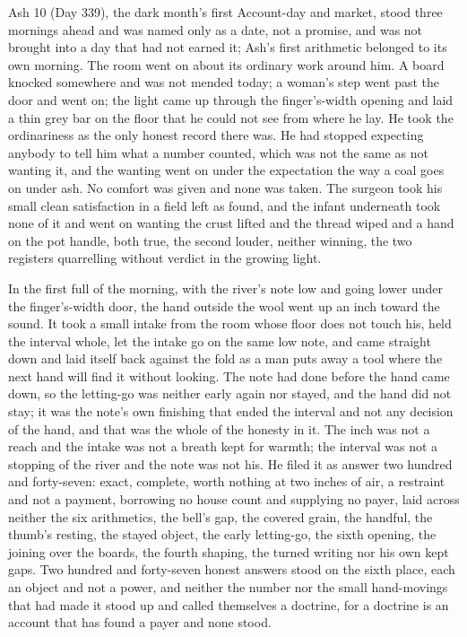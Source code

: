 Ash 10 (Day 339), the dark month's first Account-day and market, stood three mornings ahead and was named only as a date, not a promise, and was not brought into a day that had not earned it; Ash's first arithmetic belonged to its own morning. The room went on about its ordinary work around him. A board knocked somewhere and was not mended today; a woman's step went past the door and went on; the light came up through the finger's-width opening and laid a thin grey bar on the floor that he could not see from where he lay. He took the ordinariness as the only honest record there was. He had stopped expecting anybody to tell him what a number counted, which was not the same as not wanting it, and the wanting went on under the expectation the way a coal goes on under ash. No comfort was given and none was taken. The surgeon took his small clean satisfaction in a field left as found, and the infant underneath took none of it and went on wanting the crust lifted and the thread wiped and a hand on the pot handle, both true, the second louder, neither winning, the two registers quarrelling without verdict in the growing light.

In the first full of the morning, with the river's note low and going lower under the finger's-width door, the hand outside the wool went up an inch toward the sound. It took a small intake from the room whose floor does not touch his, held the interval whole, let the intake go on the same low note, and came straight down and laid itself back against the fold as a man puts away a tool where the next hand will find it without looking. The note had done before the hand came down, so the letting-go was neither early again nor stayed, and the hand did not stay; it was the note's own finishing that ended the interval and not any decision of the hand, and that was the whole of the honesty in it. The inch was not a reach and the intake was not a breath kept for warmth; the interval was not a stopping of the river and the note was not his. He filed it as answer two hundred and forty-seven: exact, complete, worth nothing at two inches of air, a restraint and not a payment, borrowing no house count and supplying no payer, laid across neither the six arithmetics, the bell's gap, the covered grain, the handful, the thumb's resting, the stayed object, the early letting-go, the sixth opening, the joining over the boards, the fourth shaping, the turned writing nor his own kept gaps. Two hundred and forty-seven honest answers stood on the sixth place, each an object and not a power, and neither the number nor the small hand-movings that had made it stood up and called themselves a doctrine, for a doctrine is an account that has found a payer and none stood.

